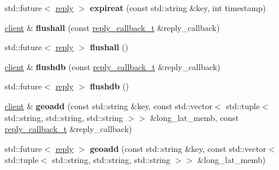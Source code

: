 \begin{DoxyCompactItemize}
\item 
\mbox{\label{classcpp__redis_1_1client_af344a8ae784f7d4d529ea9cab276906c}} 
std\+::future$<$ \hyperlink{classcpp__redis_1_1reply}{reply} $>$ {\bfseries expireat} (const std\+::string \&key, int timestamp)
\item 
\mbox{\label{classcpp__redis_1_1client_a64e5730ff850ce517709e4e7fc511309}} 
\hyperlink{classcpp__redis_1_1client}{client} \& {\bfseries flushall} (const \hyperlink{classcpp__redis_1_1client_a061a1140d36d2eaeda82b09a0bb3f9f2}{reply\+\_\+callback\+\_\+t} \&reply\+\_\+callback)
\item 
\mbox{\label{classcpp__redis_1_1client_a78f879507f060ba538de5db80a5e3009}} 
std\+::future$<$ \hyperlink{classcpp__redis_1_1reply}{reply} $>$ {\bfseries flushall} ()
\item 
\mbox{\label{classcpp__redis_1_1client_a8334064cd300cb19f0760ad7c4c84673}} 
\hyperlink{classcpp__redis_1_1client}{client} \& {\bfseries flushdb} (const \hyperlink{classcpp__redis_1_1client_a061a1140d36d2eaeda82b09a0bb3f9f2}{reply\+\_\+callback\+\_\+t} \&reply\+\_\+callback)
\item 
\mbox{\label{classcpp__redis_1_1client_acd8cea192338f42f601ea8fce5c8048c}} 
std\+::future$<$ \hyperlink{classcpp__redis_1_1reply}{reply} $>$ {\bfseries flushdb} ()
\item 
\mbox{\label{classcpp__redis_1_1client_acb21c6730ed40799cef06315db231409}} 
\hyperlink{classcpp__redis_1_1client}{client} \& {\bfseries geoadd} (const std\+::string \&key, const std\+::vector$<$ std\+::tuple$<$ std\+::string, std\+::string, std\+::string $>$$>$ \&long\+\_\+lat\+\_\+memb, const \hyperlink{classcpp__redis_1_1client_a061a1140d36d2eaeda82b09a0bb3f9f2}{reply\+\_\+callback\+\_\+t} \&reply\+\_\+callback)
\item 
\mbox{\label{classcpp__redis_1_1client_a6e4bebc3a7935bd749f2b4a6bfbb6c22}} 
std\+::future$<$ \hyperlink{classcpp__redis_1_1reply}{reply} $>$ {\bfseries geoadd} (const std\+::string \&key, const std\+::vector$<$ std\+::tuple$<$ std\+::string, std\+::string, std\+::string $>$$>$ \&long\+\_\+lat\+\_\+memb)

\end{DoxyCompactItemize}
